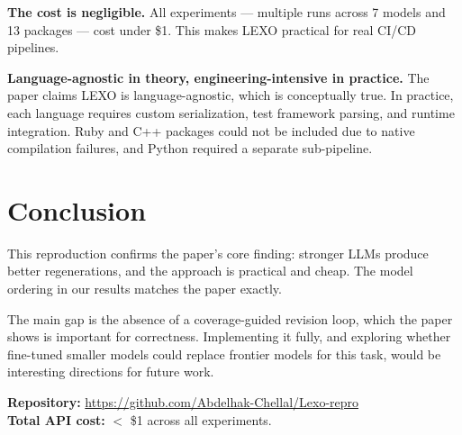 \documentclass[11pt,a4paper]{article}
\begin{document}
\textbf{The cost is negligible.} All experiments — multiple runs across 7
models and 13 packages — cost under \$1. This makes LEXO practical for real
CI/CD pipelines.

\textbf{Language-agnostic in theory, engineering-intensive in practice.} The
paper claims LEXO is language-agnostic, which is conceptually true. In practice,
each language requires custom serialization, test framework parsing, and runtime
integration. Ruby and C++ packages could not be included due to native
compilation failures, and Python required a separate sub-pipeline.

\section{Conclusion}

This reproduction confirms the paper's core finding: stronger LLMs produce
better regenerations, and the approach is practical and cheap. The model
ordering in our results matches the paper exactly.

The main gap is the absence of a coverage-guided revision loop, which the
paper shows is important for correctness. Implementing it fully, and exploring
whether fine-tuned smaller models could replace frontier models for this task,
would be interesting directions for future work.

\bigskip
\noindent\textbf{Repository:} \url{https://github.com/Abdelhak-Chellal/Lexo-repro}\\
\noindent\textbf{Total API cost:} $<$ \$1 across all experiments.
\end{document}
